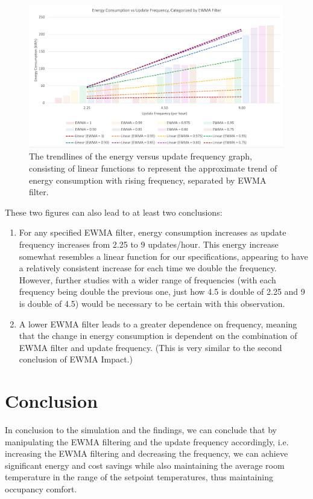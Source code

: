 \documentclass[conference,letterpaper]{IEEEtran}
\begin{document}
\begin{figure}[H]
    \includegraphics[scale=0.48]{linefreq.png}
    \caption{The trendlines of the energy versus update frequency graph, consisting of linear functions to represent the approximate trend of energy consumption with rising frequency, separated by EWMA filter.}
\end{figure}
These two figures can also lead to at least two conclusions:
\begin{enumerate}
\item For any specified EWMA filter, energy consumption increases as update frequency increases from 2.25 to 9 updates/hour. This energy increase somewhat resembles a linear function for our specifications, appearing to have a relatively consistent increase for each time we double the frequency. However, further studies with a wider range of frequencies (with each frequency being double the previous one, just how 4.5 is double of 2.25 and 9 is double of 4.5) would be necessary to be certain with this observation.
\item A lower EWMA filter leads to a greater dependence on frequency, meaning that the change in energy consumption is dependent on the combination of EWMA filter and update frequency. (This is very similar to the second conclusion of EWMA Impact.)
\end{enumerate}
\section{Conclusion}
\label{sec:Conclusion}

In conclusion to the simulation and the findings, we can conclude that by manipulating the EWMA filtering and the update frequency accordingly, i.e. increasing the EWMA filtering and decreasing the frequency, we can achieve significant energy and cost savings while also maintaining the average room temperature in the range of the setpoint temperatures, thus maintaining occupancy comfort. 
\end{document}
